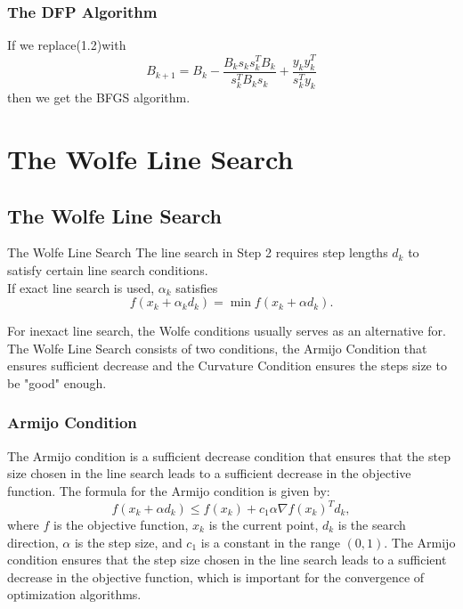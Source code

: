 \documentclass{beamer}
\begin{document}
\begin{frame}
    \frametitle{The DFP Algorithm}
    If we replace(1.2)with\begin{equation*}
B_{k+1}=B_{k}-\frac{B_{k} s_{k} s_{k}^{T} B_{k}}{s_{k}^{T} B_{k} s_{k}}+\frac{y_{k} y_{k}^{T}}{s_{k}^{T} y_{k}}
\end{equation*}
    then we get the BFGS algorithm.
    
\end{frame}



\section{The Wolfe Line Search}
\subsection{The Wolfe Line Search}

\begin{frame}{The Wolfe Line Search}
The line search in Step 2 requires step lengths $d_k$ to satisfy certain line search conditions.\\
If exact line search is used, $\alpha_k$ satisfies\begin{equation*}
    f\left(x_k+\alpha_k d_k\right)=\min f\left(x_k+\alpha d_k\right) .\tag{2.1}
\end{equation*}

For inexact line search, the Wolfe conditions usually serves as an alternative for.\\

The Wolfe Line Search consists of two conditions, the Armijo Condition that ensures sufficient decrease and the Curvature Condition ensures the steps size to be "good" enough.
\end{frame}

\begin{frame}
    \frametitle{Armijo Condition}
The Armijo condition is a sufficient decrease condition that ensures that the step size chosen in the line search leads to a sufficient decrease in the objective function.
The formula for the Armijo condition is given by:
\[f(x_k + \alpha d_k) \leq f(x_k) + c_1 \alpha \nabla f(x_k)^T d_k,\tag{2.2} \]
where $f$ is the objective function, $x_k$ is the current point, $d_k$ is the search direction, $\alpha$ is the step size, and $c_1$ is a constant in the range $(0, 1)$.  The Armijo condition ensures that the step size chosen in the line search leads to a sufficient decrease in the objective function, which is important for the convergence of optimization algorithms.   

\end{frame}
\end{document}
